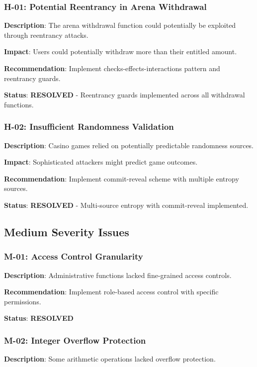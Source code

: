 \documentclass[11pt,a4paper]{article}
\begin{document}
\subsubsection{H-01: Potential Reentrancy in Arena Withdrawal}
\textbf{Description}: The arena withdrawal function could potentially be exploited through reentrancy attacks.

\textbf{Impact}: Users could potentially withdraw more than their entitled amount.

\textbf{Recommendation}: Implement checks-effects-interactions pattern and reentrancy guards.

\textbf{Status}: \textcolor{danzoGreen}{\textbf{RESOLVED}} - Reentrancy guards implemented across all withdrawal functions.

\subsubsection{H-02: Insufficient Randomness Validation}
\textbf{Description}: Casino games relied on potentially predictable randomness sources.

\textbf{Impact}: Sophisticated attackers might predict game outcomes.

\textbf{Recommendation}: Implement commit-reveal scheme with multiple entropy sources.

\textbf{Status}: \textcolor{danzoGreen}{\textbf{RESOLVED}} - Multi-source entropy with commit-reveal implemented.

\subsection{Medium Severity Issues}

\subsubsection{M-01: Access Control Granularity}
\textbf{Description}: Administrative functions lacked fine-grained access controls.

\textbf{Recommendation}: Implement role-based access control with specific permissions.

\textbf{Status}: \textcolor{danzoGreen}{\textbf{RESOLVED}}

\subsubsection{M-02: Integer Overflow Protection}
\textbf{Description}: Some arithmetic operations lacked overflow protection.
\end{document}
